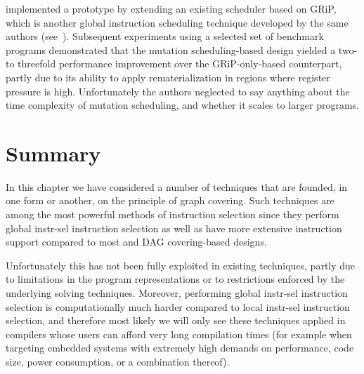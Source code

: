\citeauthor{Novack2002} implemented a prototype by extending an existing
scheduler based on \gls{GRiP}, which is another global \gls{instruction
  scheduling} technique developed by the same authors
(see~\cite{Nicolau1992}).
%
Subsequent experiments using a selected set of
benchmark \glspl{program} demonstrated that the \gls{mutation scheduling}-based
design yielded a two- to threefold performance improvement over the
\gls{GRiP}-only-based counterpart, partly due to its ability to apply
\gls{rematerialization} in regions where \gls{register pressure} is
high.
%
Unfortunately the authors neglected to say anything about the time
complexity of \gls{mutation scheduling}, and whether it scales to larger
\glspl{program}.


\section{Summary}

In this chapter we have considered a number of techniques that are founded, in
one form or another, on the \gls{principle} of \gls{graph covering}.
%
Such
techniques are among the most powerful methods of \gls{instruction selection}
since they perform \gls{global instr-sel} \gls{instruction selection} as well as
have more extensive \gls{instruction} support compared to most  and \gls{DAG covering}-based designs.

Unfortunately this has not been fully exploited in existing techniques, partly
due to limitations in the \gls{program} representations or to restrictions
enforced by the underlying solving techniques.
%
Moreover, performing \gls{global
  instr-sel} \gls{instruction selection} is computationally much harder compared
to \gls{local instr-sel} \gls{instruction selection}, and therefore most likely
we will only see these techniques applied in \glspl{compiler} whose users can
afford very long compilation times (for example when targeting embedded systems
with extremely high demands on performance, code size, power consumption, or a
combination thereof).
